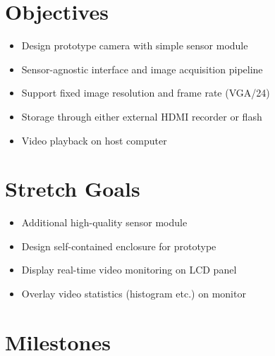 \documentclass[a4paper]{article}
\begin{document}
\section{Objectives}

\begin{itemize}
    \item Design prototype camera with simple sensor module
    \item Sensor-agnostic interface and image acquisition pipeline
    \item Support fixed image resolution and frame rate (VGA/24)
    \item Storage through either external HDMI recorder or flash
    \item Video playback on host computer
\end{itemize}

\section{Stretch Goals}

\begin{itemize}
    \item Additional high-quality sensor module
    \item Design self-contained enclosure for prototype
    \item Display real-time video monitoring on LCD panel
    \item Overlay video statistics (histogram etc.) on monitor
\end{itemize}

\section{Milestones}
\end{document}
